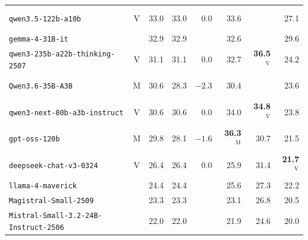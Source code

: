 \begin{table}[htbp]
{\begin{tabular}{lcrrr@{\hspace{2em}}rrr}
\texttt{qwen3.5-122b-a10b} & $\mathrm{V}$ & \cellcolor[HTML]{2194C0}33.0 & \cellcolor[HTML]{2194C0}33.0 & $0.0$ & \cellcolor[HTML]{1D90C0}33.6 & \cellcolor[HTML]{2259A6}\textcolor{white}{\textbf{41.0}$^{\mathrm{V}}$} & \cellcolor[HTML]{3FB4C4}27.1 \\
\texttt{gemma-4-31B-it} &  & \cellcolor[HTML]{2194C0}32.9 & \cellcolor[HTML]{2194C0}32.9 &  & \cellcolor[HTML]{2296C1}32.6 & \cellcolor[HTML]{2255A4}\textcolor{white}{41.6} & \cellcolor[HTML]{32A6C2}29.6 \\
\texttt{qwen3-235b-a22b-thinking-2507} & $\mathrm{V}$ & \cellcolor[HTML]{2A9EC2}31.1 & \cellcolor[HTML]{2A9EC2}31.1 & $0.0$ & \cellcolor[HTML]{2295C1}32.7 & \cellcolor[HTML]{1F7AB6}\textbf{36.5}$^{\mathrm{V}}$ & \cellcolor[HTML]{59BFC0}24.2 \\
\texttt{Qwen3.6-35B-A3B} & $\mathrm{M}$ & \cellcolor[HTML]{2DA1C2}30.6 & \cellcolor[HTML]{39AEC3}28.3 & $-2.3$ & \cellcolor[HTML]{2EA2C2}30.4 & \cellcolor[HTML]{1F77B4}\textcolor{white}{\textbf{36.9}$^{\mathrm{M}}$} & \cellcolor[HTML]{5FC1C0}23.6 \\
\texttt{qwen3-next-80b-a3b-instruct} & $\mathrm{V}$ & \cellcolor[HTML]{2DA1C2}30.6 & \cellcolor[HTML]{2DA1C2}30.6 & $0.0$ & \cellcolor[HTML]{1D8EBF}34.0 & \cellcolor[HTML]{1E87BC}\textbf{34.8}$^{\mathrm{V}}$ & \cellcolor[HTML]{5CC0C0}23.8 \\
\texttt{gpt-oss-120b} & $\mathrm{M}$ & \cellcolor[HTML]{31A5C2}29.8 & \cellcolor[HTML]{3AAEC3}28.1 & $-1.6$ & \cellcolor[HTML]{1F7CB7}\textbf{36.3}$^{\mathrm{M}}$ & \cellcolor[HTML]{2CA0C2}30.7 & \cellcolor[HTML]{72C8BD}21.5 \\
\texttt{deepseek-chat-v3-0324} & $\mathrm{V}$ & \cellcolor[HTML]{45B7C3}26.4 & \cellcolor[HTML]{45B7C3}26.4 & $0.0$ & \cellcolor[HTML]{4AB9C3}25.9 & \cellcolor[HTML]{299DC1}31.4 & \cellcolor[HTML]{70C7BD}\textbf{21.7}$^{\mathrm{V}}$ \\
\texttt{llama-4-maverick} &  & \cellcolor[HTML]{57BEC1}24.4 & \cellcolor[HTML]{57BEC1}24.4 &  & \cellcolor[HTML]{4DBAC2}25.6 & \cellcolor[HTML]{3EB3C4}27.3 & \cellcolor[HTML]{6BC6BE}22.2 \\
\texttt{Magistral-Small-2509} &  & \cellcolor[HTML]{61C2BF}23.3 & \cellcolor[HTML]{61C2BF}23.3 &  & \cellcolor[HTML]{63C3BF}23.1 & \cellcolor[HTML]{41B5C4}26.8 & \cellcolor[HTML]{7BCCBB}20.5 \\
\texttt{Mistral-Small-3.2-24B-Instruct-2506} &  & \cellcolor[HTML]{6EC7BD}22.0 & \cellcolor[HTML]{6EC7BD}22.0 &  & \cellcolor[HTML]{6FC7BD}21.9 & \cellcolor[HTML]{56BDC1}24.6 & \cellcolor[HTML]{80CEBB}20.0 \\

\end{tabular}}
\end{table}
